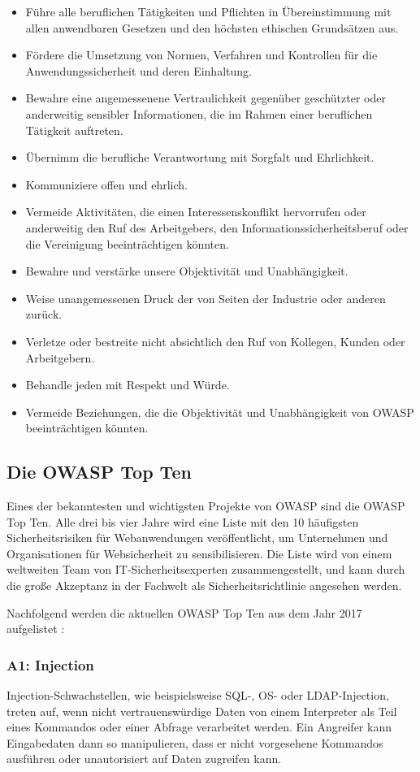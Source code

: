 \documentclass[12pt,oneside,a4paper,parskip]{scrbook}
\begin{document}
  \begin{itemize}
    \item Führe alle beruflichen Tätigkeiten und Pflichten in Übereinstimmung mit allen anwendbaren Gesetzen und den höchsten ethischen Grundsätzen aus.
    \item Fördere die Umsetzung von Normen, Verfahren und Kontrollen für die Anwendungssicherheit und deren Einhaltung.
    \item Bewahre eine angemessenene Vertraulichkeit gegenüber geschützter oder anderweitig sensibler Informationen, die im Rahmen einer beruflichen Tätigkeit auftreten.
    \item Übernimm die berufliche Verantwortung mit Sorgfalt und Ehrlichkeit.
    \item Kommuniziere offen und ehrlich.
    \item Vermeide Aktivitäten, die einen Interessenskonflikt hervorrufen oder anderweitig den Ruf des Arbeitgebers, den Informationssicherheitsberuf oder die Vereinigung beeinträchtigen könnten.
    \item Bewahre und verstärke unsere Objektivität und Unabhängigkeit.
    \item Weise unangemessenen Druck der von Seiten der Industrie oder anderen zurück.
    \item Verletze oder bestreite nicht absichtlich den Ruf von Kollegen, Kunden oder Arbeitgebern.
    \item Behandle jeden mit Respekt und Würde.
    \item Vermeide Beziehungen, die die Objektivität und Unabhängigkeit von OWASP  beeinträchtigen könnten.
  \end{itemize}
    \subsection{Die OWASP Top Ten}
    Eines der bekanntesten und wichtigsten Projekte von OWASP sind die OWASP Top Ten. Alle drei bis vier Jahre wird eine Liste mit den 10 häufigsten Sicherheitsrisiken für Webanwendungen veröffentlicht, um Unternehmen und Organisationen für Websicherheit zu sensibilisieren. Die Liste wird von einem weltweiten Team von IT-Sicherheitsexperten zusammengestellt, und kann durch die große Akzeptanz in der Fachwelt als Sicherheitsrichtlinie angesehen werden.

    Nachfolgend werden die aktuellen OWASP Top Ten aus dem Jahr 2017 aufgelistet \cite{OWASPtop10}:

    \subsubsection{A1: Injection}
    Injection-Schwachstellen, wie beispielsweise SQL-, OS- oder LDAP-Injection, treten auf, wenn
    nicht vertrauenswürdige Daten von einem Interpreter als Teil eines Kommandos oder einer
    Abfrage verarbeitet werden. Ein Angreifer kann Eingabedaten dann so manipulieren, dass er nicht
    vorgesehene Kommandos ausführen oder unautorisiert auf Daten zugreifen kann.
\end{document}
